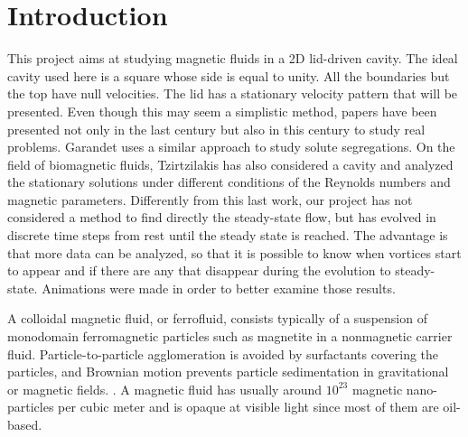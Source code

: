 \documentclass[journal]{IEEEtran}
\begin{document}
%
\IEEEpeerreviewmaketitle

\section{Introduction}
This project aims at studying magnetic fluids in a 2D lid-driven cavity. The ideal cavity used here is a square whose side is equal to unity. All the boundaries but the top have null velocities. The lid has a stationary velocity pattern that will be presented. Even though this may seem a simplistic method, papers have been presented not only in the last century but also in this century to study real problems. Garandet \cite{Garandet2012149} uses a similar approach to study solute segregations. On the field of biomagnetic fluids, Tzirtzilakis \cite{Tzirtzilakis2013} has also considered a cavity and analyzed the stationary solutions under different conditions of the Reynolds numbers and magnetic parameters. Differently from this last work, our project has not considered a method to find directly the steady-state flow, but has evolved in discrete time steps from rest until the steady state is reached. The advantage is that more data can be analyzed, so that it is possible to know when vortices start to appear and if there are any that disappear during the evolution to steady-state. Animations were made in order to better examine those results.

A colloidal magnetic fluid, or ferrofluid, consists typically of a suspension of monodomain ferromagnetic particles such as magnetite in a nonmagnetic carrier fluid. Particle-to-particle agglomeration is avoided by surfactants covering the particles, and Brownian motion prevents particle sedimentation in gravitational or magnetic fields.  \cite{RosensweigMagneticFluids}. A magnetic fluid has usually around $10^{23}$ magnetic nano-particles per cubic meter and is opaque at visible light since most of them are oil-based.
\end{document}
